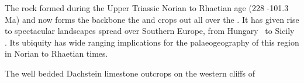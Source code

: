The rock formed during the Upper Triassic Norian to Rhaetian age (228 -101.3\,Ma) and now forms the backbone the  \citep{bosellini1974triassic} and crops out all over the  \citep{fischer1975tidal,schwarzacher2005stratification}. It has given rise to spectacular landscapes spread over Southern Europe, from Hungary \citep{haas2004characteristics} to Sicily \citep{catalano1974ciclotemi}.
Its ubiquity has wide ranging implications for the palaeogeography of this region in Norian to Rhaetian times.

\begin{marginfigure}
\caption{The well bedded Dachstein limestone outcrops on the western cliffs of  }
\label{fig:dachstein}
\end{marginfigure}

